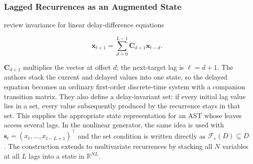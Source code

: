 \subsubsection{Lagged Recurrences as an Augmented State}

\citet{laraba2016setinvariance} review invariance for linear delay-difference
equations

\begin{equation}
    \mathbf x_{t+1}=\sum_{d=0}^{L-1}\mathbf C_{d+1}\mathbf x_{t-d}.
\end{equation}

$\mathbf C_{d+1}$ multiplies the vector at offset $d$; the next-target lag
is $\ell=d+1$. The authors
stack the current and delayed values into one state, so the delayed
equation becomes an ordinary first-order discrete-time system with a companion
transition matrix. They also define a delay-invariant set: if every initial lag
value lies in a set, every value subsequently produced by the recurrence stays
in that set. This supplies the appropriate state representation for an AST
whose leaves access several lags. In the nonlinear generator, the same idea is
used with $\mathbf{s}_t=(x_t,\ldots,x_{t-L+1})^\top$ and the set condition is
written directly as $\mathcal F_{\varepsilon}(D)\subseteq D$. The construction
extends to multivariate recurrences by stacking all $N$ variables at all $L$
lags into a state in $\mathbb R^{NL}$.
